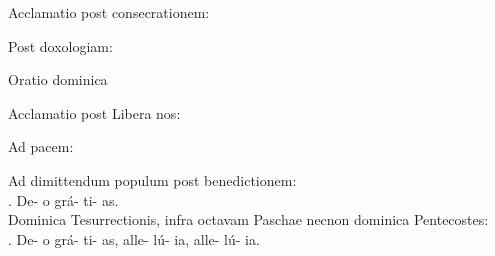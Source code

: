 \documentclass[12pt, a5paper]{book}
\begin{document}
\vspace{5mm}

\vspace{4mm}
Acclamatio post consecrationem:\\

\vspace{2mm}
Post doxologiam:\\

Oratio dominica\\


\vspace{2mm}
Acclamatio post Libera nos:\\

\vspace{2mm}
Ad pacem:\\


\vspace{2mm}
Ad dimittendum populum post benedictionem:\\
\Rbar . De- o grá- ti- as.\\

\vspace{2mm}
Dominica Tesurrectionis, infra octavam Paschae necnon dominica Pentecostes:\\
\Rbar . De- o grá- ti- as, alle- lú- ia, alle- lú- ia.\\

\newpage
{}
\newpage
\end{document}
